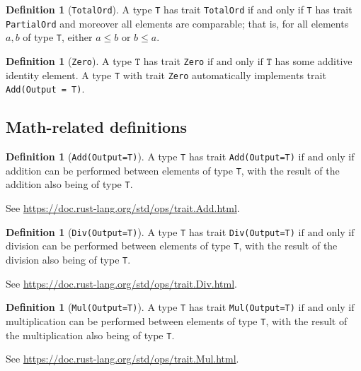 \documentclass[11pt,a4paper]{article}
\theoremstyle{definition}
\newtheorem{definition}[theorem]{Definition}
\newcommand{\inRust}[2]{See \url{#2}.}
\newcommand{\T}{\texttt{T}}
\newcommand{\iffText}{\text{if and only if}}
\begin{document}
\begin{definition}[\texttt{TotalOrd}]
\label{defn:trait-totalord}
    \label{defn:totalord}
    A type \texttt{T} has trait \texttt{TotalOrd} if and only if \texttt{T} has trait \texttt{PartialOrd} and moreover all elements are comparable; that is, for all elements $a, b$ of type \texttt{T}, either $a \leq b$ or $b \leq a$.
    
    
\end{definition}

\begin{definition}[\texttt{Zero}]
A type $\T$ has trait \texttt{Zero} $\iffText$ $\T$ has some additive identity element. A type \texttt{T} with trait \texttt{Zero} automatically implements trait \texttt{Add(Output = T)}.
\end{definition}

\subsection{Math-related definitions}
\begin{definition}[\texttt{Add(Output=T)}]
    A type \texttt{T} has trait \texttt{Add(Output=T)} $\iffText$ addition can be performed between elements of type \texttt{T}, with the result of the addition also being of type \texttt{T}.
    
    \inRust{Trait std::ops::Add}{https://doc.rust-lang.org/std/ops/trait.Add.html}

\end{definition}

\begin{definition}[\texttt{Div(Output=T)}]
    A type \texttt{T} has trait \texttt{Div(Output=T)} $\iffText$ division can be performed between elements of type \texttt{T}, with the result of the division also being of type \texttt{T}.
    
    \inRust{Trait std::ops::Div}{https://doc.rust-lang.org/std/ops/trait.Div.html}
\end{definition}

\begin{definition}[\texttt{Mul(Output=T)}]
    A type \texttt{T} has trait \texttt{Mul(Output=T)} $\iffText$ multiplication can be performed between elements of type \texttt{T}, with the result of the multiplication also being of type \texttt{T}.
    
    \inRust{Trait std::ops::Mul}{https://doc.rust-lang.org/std/ops/trait.Mul.html}
\end{definition}
\end{document}
